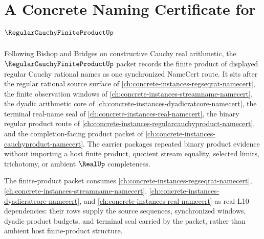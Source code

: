 \chapter{A Concrete Naming Certificate for $\RegularCauchyFiniteProductUp$}
\label{ch:concrete-instances-regular-cauchy-finite-product-namecert}

Following Bishop and Bridges on constructive Cauchy real arithmetic, the $\RegularCauchyFiniteProductUp$ packet records the finite product of displayed regular Cauchy rational names as one synchronized NameCert route. It sits after the regular rational source surface of \autoref{ch:concrete-instances-regseqrat-namecert}, the finite observation windows of \autoref{ch:concrete-instances-streamname-namecert}, the dyadic arithmetic core of \autoref{ch:concrete-instances-dyadicratcore-namecert}, the terminal real-name seal of \autoref{ch:concrete-instances-real-namecert}, the binary regular product route of \autoref{ch:concrete-instances-regularcauchyproduct-namecert}, and the completion-facing product packet of \autoref{ch:concrete-instances-cauchyproduct-namecert}. The carrier packages repeated binary product evidence without importing a host finite product, quotient stream equality, selected limits, trichotomy, or ambient $\RealUp$ completeness.

The finite-product packet consumes \autoref{ch:concrete-instances-regseqrat-namecert}, \autoref{ch:concrete-instances-streamname-namecert}, \autoref{ch:concrete-instances-dyadicratcore-namecert}, and \autoref{ch:concrete-instances-real-namecert} as real L10 dependencies: their rows supply the source sequences, synchronized windows, dyadic product budgets, and terminal seal carried by the packet, rather than ambient host finite-product structure.

